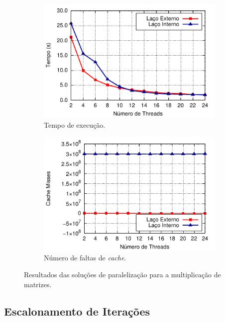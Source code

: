 \documentclass{SBCbookchapter}
\begin{document}
		\begin{figure}[t]
			\captionsetup[subfigure]{justification=centering}
			\centering
				\begin{subfigure}{0.48\linewidth}
					\includegraphics[width=\linewidth]{img/mm}
					\caption{Tempo de execução.}
					\label{figure: time mm}
				\end{subfigure}
				\quad
				\begin{subfigure}{0.48\linewidth}
					\includegraphics[width=\linewidth]{img/mm-cache}
					\caption{Número de faltas de \textit{cache}.}
					\label{figure: cache misses mm}
				\end{subfigure}
				\caption{Resultados das soluções de paralelização para a
				multiplicação de matrizes.}
		\end{figure}

	\subsection{Escalonamento de Iterações}
	\label{subsection: escalonamento de iteracoes}
\end{document}
